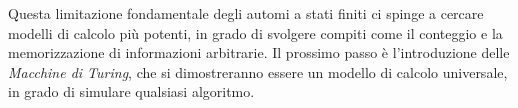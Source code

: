 \documentclass[a4paper]{article}
\begin{document}
Questa limitazione fondamentale degli automi a stati finiti ci spinge a cercare modelli di calcolo più potenti, in grado di svolgere compiti come il conteggio e la memorizzazione di informazioni arbitrarie. Il prossimo passo è l'introduzione delle \emph{Macchine di Turing}, che si dimostreranno essere un modello di calcolo universale, in grado di simulare qualsiasi algoritmo.
\end{document}
